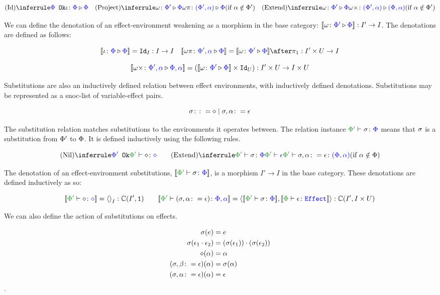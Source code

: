\documentclass{Report}
\begin{document}
\[
    \ntreeruleI{Id}{\ok{\P}}{\wrel{\i}{\P}{\P}}
    \quad
    \condtreeruleI{Project}{\wrel{\w}{\P'}{\P}}{\wrel{\w\pi}{(\P', \a)}{\P}}{\a\notin\P'}
    \quad
    \condtreeruleI{Extend}{\wrel{\w}{\P'}{\P}}{\wrel{\w\x}{(\P', \a)}{(\P, \a)}}{\a\notin\P'}
\]

We can define the denotation of an effect-environment weakening as a morphism in the base category: $\deno{\wrelw{\P'}{\P}}: I' \rightarrow I$. The denotations are defined as follows:

\[
    \deno{\wrel{\i}{\P}{\P}} = \Id{I}: I \rightarrow I
    \quad
    \deno{\wrel{\w\pi}{\P',\a}{\P}} = \deno{\wrelw{\P'}{\P}}\after \p: I'\times U\rightarrow I
\]

\[
    \deno{\wrel{\w\x}{\P',\a}{\P,\a}} = (\deno{\wrelw{\P'}{\P}}\times \Id{U}): I'\times U\rightarrow I\times U    
\]

Substitutions are also an inductively defined relation between effect environments, with inductively defined denotations. Substitutions may be represented as a snoc-list of variable-effect pairs.

\[
    \si \gens \nil \mid \si, \a \setto \e    
\]

The substitution relation matches substitutions to the environments it operates between. The relation instance $\typerelation{\P'}{\si}{\P}$ means that $\si$ is a substitution from $\P'$ to $\P$. It is defined inductively using the following rules.

\[
    \ntreeruleI{Nil}{\ok{\P'}}{\typerelation{\P'}{\nil}{\nil}}
    \quad\quad
    \condtreeruleII{Extend}{\typerelation{\P'}{\si}{\P}}{\wellformed{\P'}{\e}}{\typerelation{\P'}{\si, \a \setto\e}{(\P, \a)}}{\a\notin\P}
\]

The denotation of an effect-environment substitutions, $\deno{\typerelation{\P'}{\si}{\P}}$, is a morphism $I' \rightarrow I$ in the base category. These denotations are defined inductively as so:

\[
    \deno{\typerelation{\P'}{\nil}{\nil}} = \term{I}: \C(I', \1)
    \quad\quad
    \deno{\typerelation{\P'}{(\si, \a\setto\e)}{\P,\a}} = \pr{\deno{\typerelation{\P'}{\si}{\P}}}{\deno{\typerelation{\P}{\e}{\effect}}}: \C(I', I\times U)
\]

We can also define the action of substitutions on effects.

\begin{align*}
    \si(e) & = e \\
    \si(\e_1\dot\e_2) & = (\si(\e_1))\dot(\si(\e_2))\\
    \nil(\a) & = \a\\
    (\si, \b\setto \e)(\a) & = \si(\a) \\
    (\si, \a\setto \e)(\a) & =\e
\end{align*}.
\end{document}
